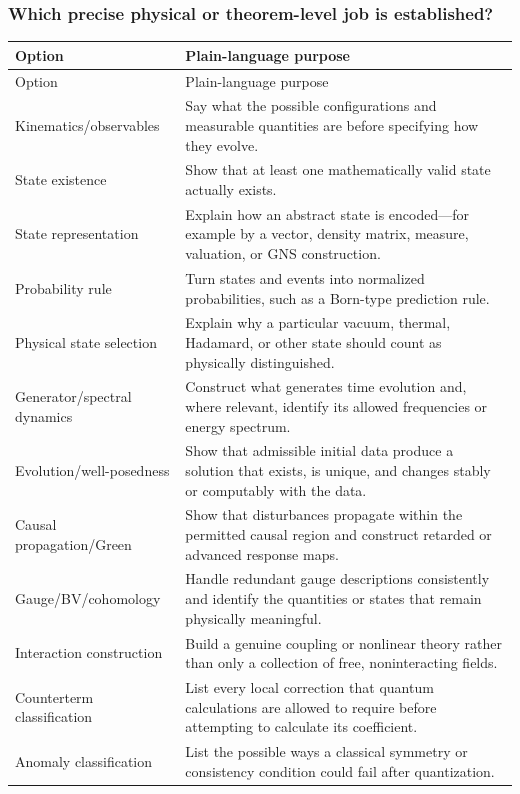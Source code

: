 \subsubsection{Which precise physical or theorem-level job is established?}
\begingroup
\small
\begin{longtable}{@{}p{}p{}@{}}
\toprule
Option & Plain-language purpose \\
\midrule
\endfirsthead
\toprule
Option & Plain-language purpose \\
\midrule
\endhead
Kinematics/observables & Say what the possible configurations and measurable quantities are before specifying how they evolve. \\
State existence & Show that at least one mathematically valid state actually exists. \\
State representation & Explain how an abstract state is encoded---for example by a vector, density matrix, measure, valuation, or GNS construction. \\
Probability rule & Turn states and events into normalized probabilities, such as a Born-type prediction rule. \\
Physical state selection & Explain why a particular vacuum, thermal, Hadamard, or other state should count as physically distinguished. \\
Generator/spectral dynamics & Construct what generates time evolution and, where relevant, identify its allowed frequencies or energy spectrum. \\
Evolution/well-posedness & Show that admissible initial data produce a solution that exists, is unique, and changes stably or computably with the data. \\
Causal propagation/Green & Show that disturbances propagate within the permitted causal region and construct retarded or advanced response maps. \\
Gauge/BV/cohomology & Handle redundant gauge descriptions consistently and identify the quantities or states that remain physically meaningful. \\
Interaction construction & Build a genuine coupling or nonlinear theory rather than only a collection of free, noninteracting fields. \\
Counterterm classification & List every local correction that quantum calculations are allowed to require before attempting to calculate its coefficient. \\
Anomaly classification & List the possible ways a classical symmetry or consistency condition could fail after quantization. \\

\end{longtable}

